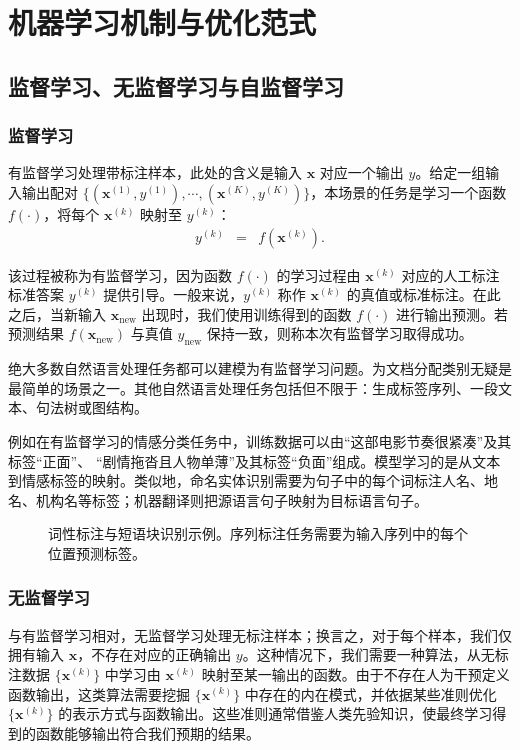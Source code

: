\section{机器学习机制与优化范式}



\subsection{监督学习、无监督学习与自监督学习}

\subsubsection{监督学习}
有监督学习处理带标注样本，此处的含义是输入 $\mathbf{x}$ 对应一个输出 $y$。给定一组输入输出配对 $\{(\mathbf{x}^{(1)},y^{(1)}),\cdots,(\mathbf{x}^{(K)},y^{(K)})\}$，本场景的任务是学习一个函数 $f(\cdot)$，将每个 $\mathbf{x}^{(k)}$ 映射至 $y^{(k)}$：
\begin{eqnarray}
y^{(k)} & = & f(\mathbf{x}^{(k)}).
\end{eqnarray}

\noindent 该过程被称为有监督学习，因为函数 $f(\cdot)$ 的学习过程由 $\mathbf{x}^{(k)}$ 对应的人工标注标准答案 $y^{(k)}$ 提供引导。一般来说，$y^{(k)}$ 称作 $\mathbf{x}^{(k)}$ 的真值或标准标注。在此之后，当新输入 $\mathbf{x}_{\mathrm{new}}$ 出现时，我们使用训练得到的函数 $f(\cdot)$ 进行输出预测。若预测结果 $f(\mathbf{x}_{\mathrm{new}})$ 与真值 $y_{\mathrm{new}}$ 保持一致，则称本次有监督学习取得成功。

绝大多数自然语言处理任务都可以建模为有监督学习问题。为文档分配类别无疑是最简单的场景之一。其他自然语言处理任务包括但不限于：生成标签序列、一段文本、句法树或图结构。


例如在有监督学习的情感分类任务中，训练数据可以由“这部电影节奏很紧凑”及其标签“正面”、 “剧情拖沓且人物单薄”及其标签“负面”组成。模型学习的是从文本到情感标签的映射。类似地，命名实体识别需要为句子中的每个词标注人名、地名、机构名等标签；机器翻译则把源语言句子映射为目标语言句子。

\begin{figure}[htbp]
  \centering
  
  \caption{词性标注与短语块识别示例。序列标注任务需要为输入序列中的每个位置预测标签。}
  \label{fig:nlpbook-pos-tagging-chunking}
\end{figure}

\subsubsection{无监督学习}
与有监督学习相对，无监督学习处理无标注样本；换言之，对于每个样本，我们仅拥有输入 $\mathbf{x}$，不存在对应的正确输出 $y$。这种情况下，我们需要一种算法，从无标注数据 $\{\mathbf{x}^{(k)}\}$ 中学习由 $\mathbf{x}^{(k)}$ 映射至某一输出的函数。由于不存在人为干预定义函数输出，这类算法需要挖掘 $\{\mathbf{x}^{(k)}\}$ 中存在的内在模式，并依据某些准则优化 $\{\mathbf{x}^{(k)}\}$ 的表示方式与函数输出。这些准则通常借鉴人类先验知识，使最终学习得到的函数能够输出符合我们预期的结果。

